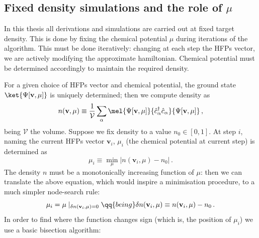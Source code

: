 \subsection{Fixed density simulations and the role of $\mu$}\label{subsec:fixed-density-role-mu}

In this thesis all derivations and simulations are carried out at fixed target density. This is done by fixing the chemical potential $\mu$ during iterations of the algorithm. This must be done iteratively: changing at each step the HFPs vector, we are actively modifying the approximate hamiltonian. Chemical potential must be determined accordingly to maintain the required density. 

For a given choice of HFPs vector and chemical potential, the ground state $\ket{\Psi[\mathbf{v},\mu]}$ is uniquely determined; then we compute density as
\[
	n(\mathbf{v},\mu) \equiv \frac{1}{\mathcal{V}} \sum_{\alpha} \mel{\Psi[\mathbf{v},\mu]}{\hat c_\alpha^\dagger \hat c_\alpha}{\Psi[\mathbf{v},\mu]} \, ,
\]
being $\mathcal{V}$ the volume. Suppose we fix density to a value $n_0\in[0,1]$. At step $i$, naming the current HFPs vector $\mathbf{v}_i$, $\mu_i$ (the chemical potential at current step) is determined as
\begin{equation}\label{eq:mu-numerical-minimization}
	\mu_i \equiv
	\min_\mu \left|
	n(\mathbf{v}_i,\mu) - n_0
	\right| \, .
\end{equation}
The density $n$ must be a monotonically increasing function of $\mu$: then we can translate the above equation, which would inspire a minimisation procedure, to a much simpler node-search rule:
\[
	\mu_i = \mu \mid_{\delta n(\mathbf{v}_i,\mu) = 0}
	\qq{being}
	\delta n(\mathbf{v}_i,\mu) \equiv n(\mathbf{v}_i,\mu) - n_0 \, .
\]
In order to find where the function changes sign (which is, the position of $\mu_i$) we use a basic bisection algorithm:
